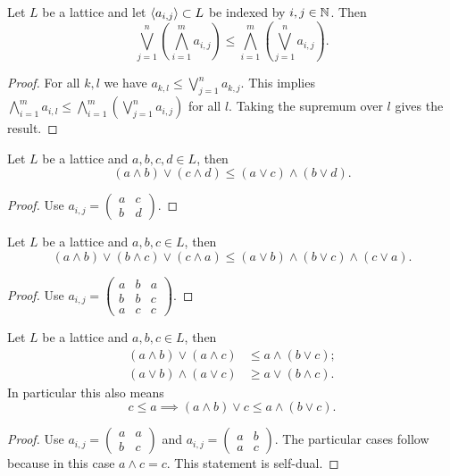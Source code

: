 \begin{proposition}
Let $L$ be a lattice and let $\left\langle a_{i,j} \right\rangle\subset L$ be indexed by $i,j\in \mathbb{N}$. Then
\[ \bigvee_{j=1}^n \left(\bigwedge_{i=1}^m a_{i,j}\right) \leq \bigwedge_{i=1}^m \left(\bigvee_{j=1}^n a_{i,j}\right). \]
\end{proposition}
\begin{proof}
For all $k,l$ we have $a_{k,l}\leq \bigvee_{j=1}^n a_{k,j}$. This implies $\bigwedge_{i=1}^m a_{i,l} \leq \bigwedge_{i=1}^m \left(\bigvee_{j=1}^n a_{i,j}\right)$ for all $l$. Taking the supremum over $l$ gives the result.
\end{proof}
\begin{corollary} \label{firstMiniMaxCorollary}
Let $L$ be a lattice and $a,b,c,d \in L$, then
\[ (a\wedge b)\vee (c\wedge d) \leq (a\vee c)\wedge (b\vee d). \]
\end{corollary}
\begin{proof}
Use $a_{i,j} = \begin{pmatrix}
a & c \\ b & d
\end{pmatrix}$.
\end{proof}
\begin{corollary}
Let $L$ be a lattice and $a,b,c \in L$, then
\[ (a\wedge b) \vee (b\wedge c) \vee (c\wedge a) \leq (a\vee b)\wedge (b\vee c) \wedge (c\vee a). \]
\end{corollary}
\begin{proof}
Use $a_{i,j} = \begin{pmatrix}
a & b & a \\ b & b & c \\ a & c & c
\end{pmatrix}$.
\end{proof}
\begin{corollary} \label{distributiveInequality}
Let $L$ be a lattice and $a,b,c \in L$, then
\begin{align*}
(a\wedge b)\vee (a\wedge c) &\leq a\wedge (b \vee c); \\
(a\vee b)\wedge (a\vee c) &\geq a\vee (b \wedge c).
\end{align*}
In particular this also means
\[ c \leq a \implies (a\wedge b)\vee c \leq a\wedge (b\vee c).  \]
\end{corollary}
\begin{proof}
Use $a_{i,j} = \begin{pmatrix}
a & a \\ b & c 
\end{pmatrix}$ and $a_{i,j} = \begin{pmatrix}
a & b \\ a & c 
\end{pmatrix}$. The particular cases follow because in this case $a\wedge c = c$. This statement is self-dual.
\end{proof}
